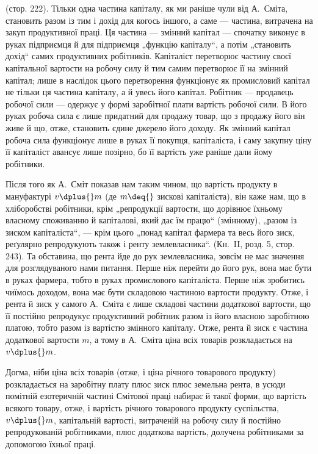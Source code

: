 \parcont{}  %
 (стор. 222). Тільки одна частина капіталу, як ми
раніше чули від А.~Сміта, становить разом із тим і дохід для когось
іншого, а саме — частина, витрачена на закуп продуктивної праці. Ця частина
— змінний капітал — спочатку виконує в руках підприємця й для підприємця
„функцію капіталу“, а потім „становить дохід“ самих продуктивних
робітників. Капіталіст перетворює частину своєї капітальної вартости на
робочу силу й тим самим перетворює її на змінний капітал; лише в наслідок
цього перетворення функціонує як промисловий капітал не тільки ця частина
капіталу, а й увесь його капітал. Робітник — продавець робочої сили — одержує
у формі заробітної плати вартість робочої сили. В його руках робоча
сила є лише придатний для продажу товар, що з продажу його він живе
й що, отже, становить єдине джерело його доходу. Як змінний капітал
робоча сила функціонує лише в руках її покупця, капіталіста, і саму
закупну ціну її капіталіст авансує лише позірно, бо її вартість уже раніше
дали йому робітники.

Після того як А.~Сміт показав нам таким чином, що вартість продукту
в мануфактурі \deq{} $v \dplus{} m$ (де $m \deq{}$ зискові капіталіста), він каже нам,
що в хліборобстві робітники, крім „репродукції вартости, що дорівнює
їхньому власному споживанню й капіталові, який дає їм працю“ (змінному),
„разом із зиском капіталіста“, — крім цього „понад капітал фармера
та весь його зиск, реґулярно репродукують також і ренту землевласника“.
(Кн.~II, розд. 5, стор. 243). Та обставина, що рента
йде до рук землевласника, зовсім не має значення для розглядуваного
нами питання. Перше ніж перейти до його рук, вона має бути в
руках фармера, тобто в руках промислового капіталіста. Перше ніж зробитись
чиїмось доходом, вона має бути складовою частиною вартости
продукту. Отже, і рента й зиск у самого А.~Сміта є лише складові частини
додаткової вартости, що її постійно репродукує продуктивний робітник
разом із його власною заробітною платою, тобто разом із вартістю
змінного капіталу. Отже, рента й зиск є частина додаткової вартости
$m$, а тому в А.~Сміта ціна всіх товарів розкладається на $v \dplus{} m$.

Догма, ніби ціна всіх товарів (отже, і ціна річного товарового продукту)
розкладається на заробітну плату плюс зиск плюс земельна рента, в
усюди помітній езотеричній частині Смітової праці набирає й такої форми,
що вартість всякого товару, отже, і вартість річного товарового продукту
суспільства, \deq{} $v \dplus{} m$, \deq{} капітальній вартості, витраченій на робочу силу
й постійно репродукованій робітниками, плюс додаткова вартість, долучена
робітниками за допомогою їхньої праці.

